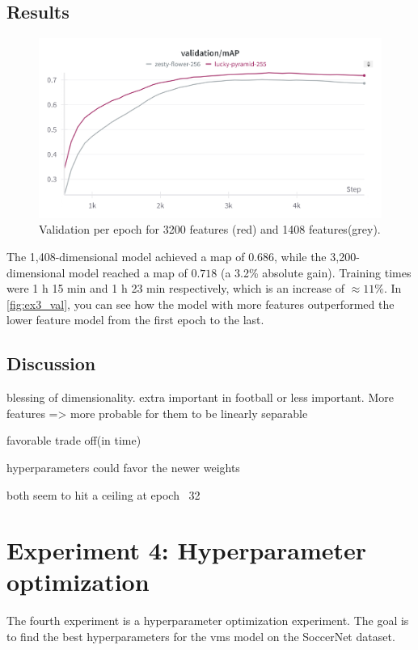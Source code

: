 \subsection{Results}
\label{ssec:ex3_results}

\begin{figure}
    \centering
    \includegraphics[width=0.75\linewidth]{figures/1408_3200_val.png}
    \caption{Validation per epoch for 3200 features (red) and 1408 features(grey). }
    \label{fig:ex3_val}
\end{figure}
The 1,408-dimensional model achieved a  \acrshort{map} of \(0.686\), while the 3,200-dimensional model reached a \acrshort{map} of \(0.718\) (a 3.2\% absolute gain). Training times were 1 h 15 min and 1 h 23 min respectively, which is an increase of \(\approx11\%\). In \autoref{fig:ex3_val}, you can see how the model with more features outperformed the lower feature model from the first epoch to the last. 


\subsection{Discussion}
\label{ssec:ex3_discussion}

blessing of dimensionality. extra important in football or less important. More features => more probable for them to be linearly separable

favorable trade off(in time)

hyperparameters could favor the newer weights

both seem to hit a ceiling at epoch ~32


\section{Experiment 4: Hyperparameter optimization}
\label{sec:experiment4}

The fourth experiment is a hyperparameter optimization experiment.
The goal is to find the best hyperparameters for the \acrshort{vms} model on the SoccerNet dataset.

